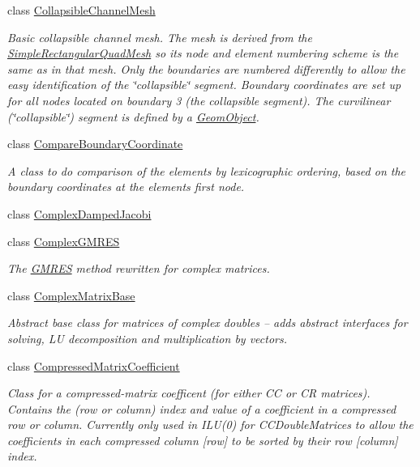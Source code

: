 \begin{DoxyCompactItemize}
class \hyperlink{classoomph_1_1CollapsibleChannelMesh}{Collapsible\+Channel\+Mesh}
\begin{DoxyCompactList}\small\item\em Basic collapsible channel mesh. The mesh is derived from the {\ttfamily \hyperlink{classoomph_1_1SimpleRectangularQuadMesh}{Simple\+Rectangular\+Quad\+Mesh}} so it\textquotesingle{}s node and element numbering scheme is the same as in that mesh. Only the boundaries are numbered differently to allow the easy identification of the \char`\"{}collapsible\char`\"{} segment. Boundary coordinates are set up for all nodes located on boundary 3 (the collapsible segment). The curvilinear (\char`\"{}collapsible\char`\"{}) segment is defined by a {\ttfamily \hyperlink{classoomph_1_1GeomObject}{Geom\+Object}}. \end{DoxyCompactList}\item 
class \hyperlink{classoomph_1_1CompareBoundaryCoordinate}{Compare\+Boundary\+Coordinate}
\begin{DoxyCompactList}\small\item\em A class to do comparison of the elements by lexicographic ordering, based on the boundary coordinates at the element\textquotesingle{}s first node. \end{DoxyCompactList}\item 
class \hyperlink{classoomph_1_1ComplexDampedJacobi}{Complex\+Damped\+Jacobi}
\item 
class \hyperlink{classoomph_1_1ComplexGMRES}{Complex\+G\+M\+R\+ES}
\begin{DoxyCompactList}\small\item\em The \hyperlink{classoomph_1_1GMRES}{G\+M\+R\+ES} method rewritten for complex matrices. \end{DoxyCompactList}\item 
class \hyperlink{classoomph_1_1ComplexMatrixBase}{Complex\+Matrix\+Base}
\begin{DoxyCompactList}\small\item\em Abstract base class for matrices of complex doubles -- adds abstract interfaces for solving, LU decomposition and multiplication by vectors. \end{DoxyCompactList}\item 
class \hyperlink{classoomph_1_1CompressedMatrixCoefficient}{Compressed\+Matrix\+Coefficient}
\begin{DoxyCompactList}\small\item\em Class for a compressed-\/matrix coefficent (for either CC or CR matrices). Contains the (row or column) index and value of a coefficient in a compressed row or column. Currently only used in I\+L\+U(0) for C\+C\+Double\+Matrices to allow the coefficients in each compressed column \mbox{[}row\mbox{]} to be sorted by their row \mbox{[}column\mbox{]} index. \end{DoxyCompactList}\item 

\end{DoxyCompactItemize}
